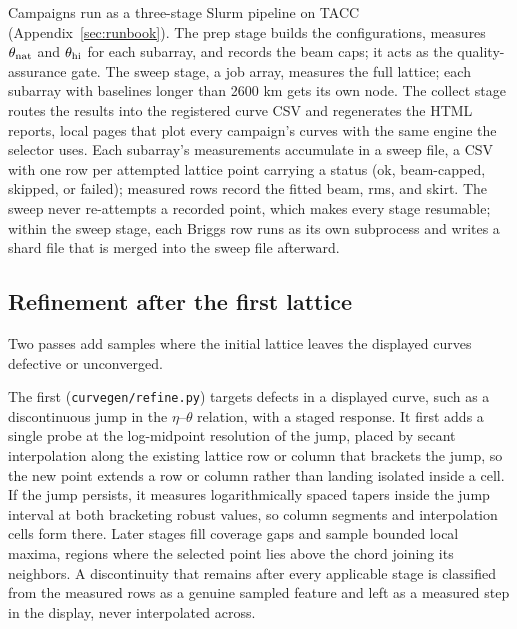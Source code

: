 \documentclass[11pt]{article}
\begin{document}
Campaigns run as a three-stage Slurm pipeline on TACC
(Appendix~\ref{sec:runbook}).  The prep stage builds the configurations,
measures $\theta_{\rm nat}$ and $\theta_{\rm hi}$ for each subarray, and
records the beam caps; it acts as the quality-assurance gate.  The sweep
stage, a job array, measures the full lattice; each subarray with
baselines longer than 2600 km gets its own node.  The collect stage routes
the results into the registered curve CSV and regenerates the HTML
reports, local pages that plot every campaign's curves with the same
engine the selector uses.  Each subarray's measurements accumulate in a
sweep file, a CSV with one row per attempted lattice point carrying a
status (ok, beam-capped, skipped, or failed); measured rows record the
fitted beam, rms, and skirt.  The sweep never re-attempts a recorded
point, which makes every stage resumable; within the sweep stage, each
Briggs row runs as its own subprocess and writes a shard file that is
merged into the sweep file afterward.

\subsection{Refinement after the first lattice}
\label{sec:refinement}

Two passes add samples where the initial lattice leaves the displayed
curves defective or unconverged.

The first (\texttt{curvegen/refine.py}) targets defects in a displayed
curve, such as a discontinuous jump in the $\eta$--$\theta$ relation, with
a staged response.  It first adds a single probe at the log-midpoint
resolution of the jump, placed by secant interpolation along the existing
lattice row or column that brackets the jump, so the new point extends a
row or column rather than landing isolated inside a cell.  If the jump
persists, it measures logarithmically spaced tapers inside the jump
interval at both bracketing robust values, so column segments and
interpolation cells form there.  Later stages fill coverage gaps and
sample bounded local maxima, regions where the selected point lies above
the chord joining its neighbors.  A discontinuity that remains after every
applicable stage is classified from the measured rows as a genuine sampled
feature and left as a measured step in the display, never interpolated
across.
\end{document}
